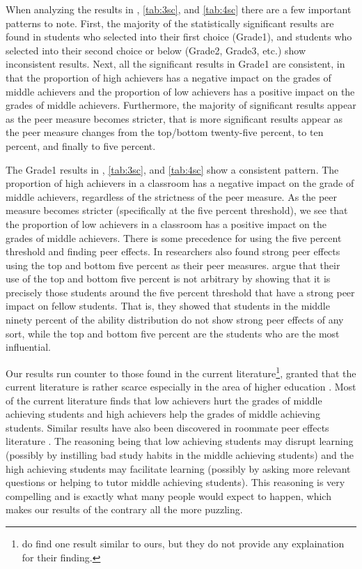 \clearpage{}

When analyzing the results in , \ref{tab:3sc}, and \ref{tab:4sc} there are a few important patterns to note. 
First, the majority of the statistically significant results are found in students who selected into their first choice (Grade1), and students who selected into their second choice or below (Grade2, Grade3, etc.) show inconsistent results. 
Next, all the significant results in Grade1 are consistent, in that the proportion of high achievers has a negative impact on the grades of middle achievers and the proportion of low achievers has a positive impact on the grades of middle achievers. 
Furthermore, the majority of significant results appear as the peer measure becomes stricter, that is more significant results appear as the peer measure changes from the top/bottom twenty-five percent, to ten percent, and finally to five percent. 
 
The Grade1 results in , \ref{tab:3sc}, and \ref{tab:4sc} show a consistent pattern. 
The proportion of high achievers in a classroom has a negative impact on the grade of middle achievers, regardless of the strictness of the peer measure. 
As the peer measure becomes stricter (specifically at the five percent threshold), we see that the proportion of low achievers in a classroom has a positive impact on the grades of middle achievers. 
There is some precedence for using the five percent threshold and finding peer effects. 
In \citet{lavy2012good} researchers also found strong peer effects using the top and bottom five percent as their peer measures. 
\citeauthor{lavy2012good} argue that their use of the top and bottom five percent is not arbitrary by showing that it is precisely those students around the five percent threshold that have a strong peer impact on fellow students. 
That is, they showed that students in the middle ninety percent of the ability distribution do not show strong peer effects of any sort, while the top and bottom five percent are the students who are the most influential. 

Our results run counter to those found in the current literature\footnote{\citet{burke2013classroom} do find one result similar to ours, but they do not provide any explaination for their finding.}, granted that the current literature is rather scarce especially in the area of higher education \citep{kang2007classroom,carman2012classroom,burke2013classroom,schlosser2008inside,lavy2012good}. 
Most of the current literature finds that low achievers hurt the grades of middle achieving students and high achievers help the grades of middle achieving students. 
Similar results have also been discovered in roommate peer effects literature \citep{griffith2014peer,zimmerman2003peer,sacerdote2000peer}.
The reasoning being that low achieving students may disrupt learning (possibly by instilling bad study habits in the middle achieving students) and the high achieving students may facilitate learning (possibly by asking more relevant questions or helping to tutor middle achieving students). 
This reasoning is very compelling and is exactly what many people would expect to happen, which makes our results of the contrary all the more puzzling.  

